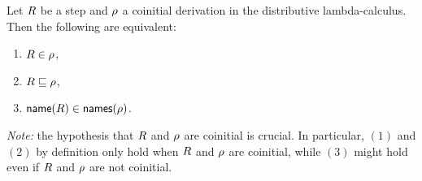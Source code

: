 \begin{lemma}
Let $R$ be a step and $\rho$ a coinitial derivation
in the distributive lambda-calculus.
Then the following are equivalent:
\begin{enumerate}
\item $R \in \rho$,
\item $R \sqsubseteq \rho$,
\item $\mathsf{name}(R) \in \mathsf{names}(\rho)$.
\end{enumerate}
{\em Note:} the hypothesis that $R$ and $\rho$ are coinitial is crucial.
In particular, $(1)$ and $(2)$ by definition only hold when $R$ and $\rho$ are coinitial,
while $(3)$ might hold even if $R$ and $\rho$ are not coinitial.
\end{lemma}

